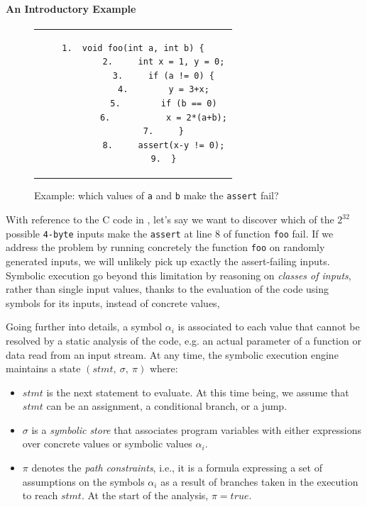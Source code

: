 \paragraph{An Introductory Example}


\label{symbolic-execution-example}
\begin{figure}[t]
	\begin{center}
		\begin{tabular}{c}
			\begin{lstlisting}[basicstyle=\ttfamily\scriptsize]
			1.  void foo(int a, int b) {
			2.     int x = 1, y = 0;
			3.     if (a != 0) {
			4.        y = 3+x;
			5.        if (b == 0)
			6.           x = 2*(a+b);
			7.     }
			8.     assert(x-y != 0);
			9.  }
			\end{lstlisting}
		\end{tabular}
	\end{center}
	\vspace{-2mm}
	\caption{Example: which values of \texttt{a} and \texttt{b} make the \texttt{assert} fail?}
	\label{fig:example-1}
	\vspace{-1.5mm}
\end{figure}

With reference to the C code in , let's say we want to discover which of the $2^{32}$ possible \texttt{4-byte} inputs make the \texttt{assert} at line 8 of function \texttt{foo} fail. If we address the problem by running concretely the function \texttt{foo} on randomly generated inputs, we will unlikely pick up exactly the assert-failing inputs. Symbolic execution go beyond this limitation by reasoning on {\em classes of inputs}, rather than single input values, thanks to the evaluation of the code using symbols for its inputs, instead of concrete values,  

Going further into details, a symbol $\alpha_i$ is associated to each value that cannot be resolved by a static analysis of the code, e.g. an actual parameter of a function or data read from an input stream. At any time, the symbolic execution engine maintains a state $(stmt,~\sigma,~\pi)$ where:

\begin{itemize}
	\item $stmt$ is the next statement to evaluate. At this time being, we assume that $stmt$ can be an assignment, a conditional branch, or a jump.
	
	\item $\sigma$ is a {\em symbolic store} that associates program variables with either expressions over concrete values or symbolic values $\alpha_i$.
	
	\item $\pi$ denotes the {\em path constraints}, i.e., it is a formula expressing a set of assumptions on the symbols $\alpha_i$ as a result of branches taken in the execution to reach $stmt$. At the start of the analysis, $\pi=true$.
\end{itemize}

